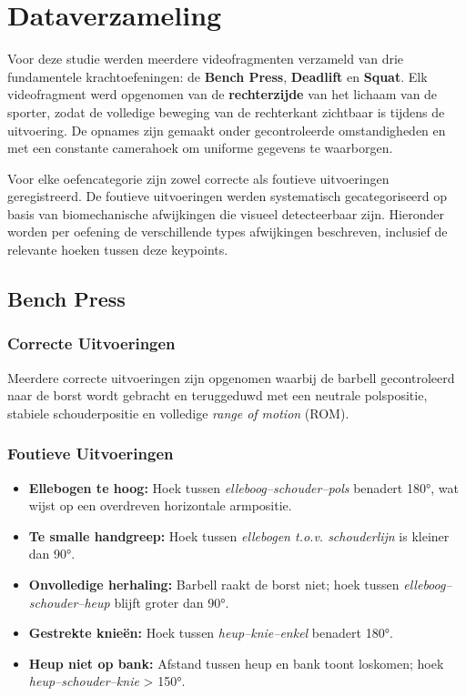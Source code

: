 \chapter{Dataverzameling}
\label{ch:dataverzameling}

Voor deze studie werden meerdere videofragmenten verzameld van drie fundamentele krachtoefeningen: de \textbf{Bench Press}, \textbf{Deadlift} en \textbf{Squat}. 
Elk videofragment werd opgenomen van de \textbf{rechterzijde} van het lichaam van de sporter, zodat de volledige beweging van de rechterkant zichtbaar is tijdens de uitvoering. 
De opnames zijn gemaakt onder gecontroleerde omstandigheden en met een constante camerahoek om uniforme gegevens te waarborgen.

Voor elke oefencategorie zijn zowel correcte als foutieve uitvoeringen geregistreerd. 
De foutieve uitvoeringen werden systematisch gecategoriseerd op basis van biomechanische afwijkingen die visueel detecteerbaar zijn. 
Hieronder worden per oefening de verschillende types afwijkingen beschreven, inclusief de relevante hoeken tussen deze keypoints.

\section{Bench Press}
\subsection{Correcte Uitvoeringen}
Meerdere correcte uitvoeringen zijn opgenomen waarbij de barbell gecontroleerd naar de borst wordt gebracht en teruggeduwd met een neutrale polspositie, stabiele schouderpositie en volledige \textit{range of motion} (ROM).

\subsection{Foutieve Uitvoeringen}
\begin{itemize}
    \item \textbf{Ellebogen te hoog:} Hoek tussen \textit{elleboog–schouder–pols} benadert 180°, wat wijst op een overdreven horizontale armpositie.     
    \item \textbf{Te smalle handgreep:} Hoek tussen \textit{ellebogen t.o.v. schouderlijn} is kleiner dan 90°.      
    \item \textbf{Onvolledige herhaling:} Barbell raakt de borst niet; hoek tussen \textit{elleboog–schouder–heup} blijft groter dan 90°.
    \item \textbf{Gestrekte knieën:} Hoek tussen \textit{heup–knie–enkel} benadert 180°.
    \item \textbf{Heup niet op bank:} Afstand tussen heup en bank toont loskomen; hoek \textit{heup–schouder–knie} > 150°.
\end{itemize}

